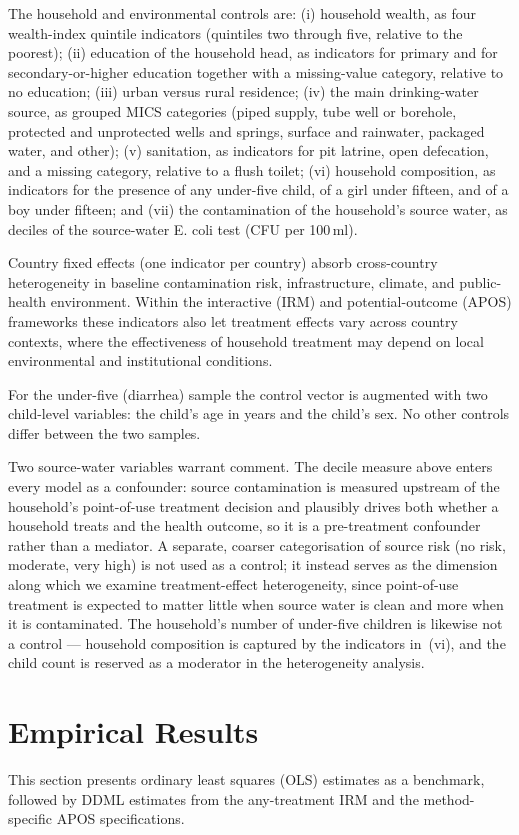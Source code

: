 \documentclass [11pt]{article}
\theoremstyle{plain}
\theoremstyle{definition}
\theoremstyle{remark}
\newcommand{\1}{\bm{1}}
\begin{document}
The household and environmental controls are: (i) household wealth, as four wealth-index quintile indicators (quintiles two through five, relative to the poorest); (ii) education of the household head, as indicators for primary and for secondary-or-higher education together with a missing-value category, relative to no education; (iii) urban versus rural residence; (iv) the main drinking-water source, as grouped MICS categories (piped supply, tube well or borehole, protected and unprotected wells and springs, surface and rainwater, packaged water, and other); (v) sanitation, as indicators for pit latrine, open defecation, and a missing category, relative to a flush toilet; (vi) household composition, as indicators for the presence of any under-five child, of a girl under fifteen, and of a boy under fifteen; and (vii) the contamination of the household's source water, as deciles of the source-water E. coli test (CFU per 100\,ml).

Country fixed effects (one indicator per country) absorb cross-country heterogeneity in baseline contamination risk, infrastructure, climate, and public-health environment. Within the interactive (IRM) and potential-outcome (APOS) frameworks these indicators also let treatment effects vary across country contexts, where the effectiveness of household treatment may depend on local environmental and institutional conditions.

For the under-five (diarrhea) sample the control vector is augmented with two child-level variables: the child's age in years and the child's sex. No other controls differ between the two samples.

Two source-water variables warrant comment. The decile measure above enters every model as a confounder: source contamination is measured upstream of the household's point-of-use treatment decision and plausibly drives both whether a household treats and the health outcome, so it is a pre-treatment confounder rather than a mediator. A separate, coarser categorisation of source risk (no risk, moderate, very high) is not used as a control; it instead serves as the dimension along which we examine treatment-effect heterogeneity, since point-of-use treatment is expected to matter little when source water is clean and more when it is contaminated. The household's number of under-five children is likewise not a control --- household composition is captured by the indicators in~(vi), and the child count is reserved as a moderator in the heterogeneity analysis.

\section{Empirical Results}\label{Empirical}
This section presents ordinary least squares (OLS) estimates as a benchmark, followed by DDML estimates from the any-treatment IRM and the method-specific APOS specifications.
\end{document}
